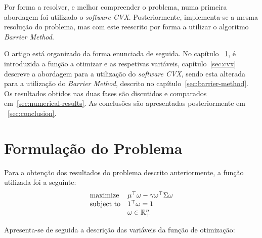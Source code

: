 \documentclass[a4paper]{IEEEtran}
\begin{document}
Por forma a resolver, e melhor compreender o problema, numa primeira abordagem foi utilizado o \textit{software CVX}. Posteriormente, implementa-se a mesma resolução do problema, mas com este reescrito por forma a utilizar o algoritmo \textit{Barrier Method}. 


O artigo está organizado da forma enunciada de seguida. No capítulo
~\ref{sec:problem-formulation}, é introduzida a função a otimizar e as respetivas variáveis,  capítulo~\ref{sec:cvx} descreve a abordagem para a utilização do \textit{software CVX}, sendo esta alterada para a utilização do \textit{Barrier Method}, descrito no capítulo~\ref{sec:barrier-method}. Os resultados obtidos nas duas fases são discutidos e comparados em~\ref{sec:numerical-results}. As conclusões são apresentadas posteriormente em ~\ref{sec:conclusion}.

\section{Formulação do Problema}
\label{sec:problem-formulation}

Para a obtenção dos resultados do problema descrito anteriormente, a função utilizada foi a seguinte:
\begin{equation}
  \label{eq:problem}
\begin{array}[t]{ll} \text{maximize} & \mu^\top \omega - \gamma \omega^\top \Sigma \omega \\
\text{subject to} & 1^\top \omega = 1 \\ &  \omega \in \mathbb{R}_+^n \end{array}
\end{equation}

Apresenta-se de seguida a descrição das variáveis da função de otimização:
\end{document}
